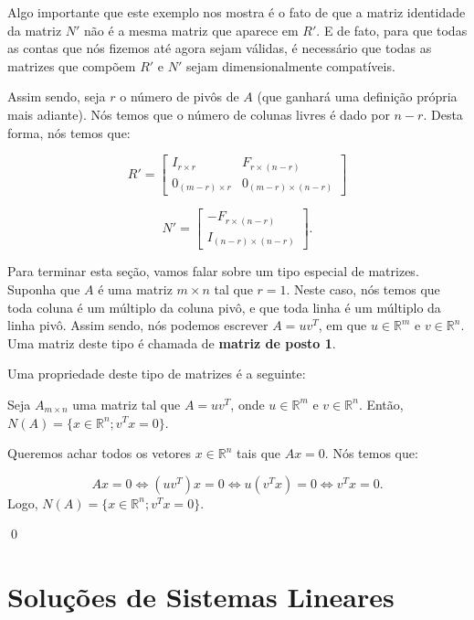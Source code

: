 Algo importante que este exemplo nos mostra é o fato de que a matriz identidade da matriz $N'$ não é a mesma matriz que aparece em $R'$. E de fato, para que todas as contas que nós fizemos até agora sejam válidas, é necessário que todas as matrizes que compõem $R'$ e $N'$ sejam dimensionalmente compatíveis.

Assim sendo, seja $r$ o número de pivôs de $A$ (que ganhará uma definição própria mais adiante). Nós temos que o número de colunas livres é dado por $n - r$. Desta forma, nós temos que:

$$
R' = \begin{bmatrix}
	I_{r\times r} & F_{r\times(n - r)} \\
	0_{(m - r)\times r} & 0_{(m - r)\times(n - r)}
\end{bmatrix}
$$

$$
N' = \begin{bmatrix}
	-F_{r\times(n - r)} \\
	I_{(n - r)\times(n - r)}
\end{bmatrix}.
$$

Para terminar esta seção, vamos falar sobre um tipo especial de matrizes. Suponha que $A$ é uma matriz $m\times n$ tal que $r = 1$. Neste caso, nós temos que toda coluna é um múltiplo da coluna pivô, e que toda linha é um múltiplo da linha pivô. Assim sendo, nós podemos escrever $A = uv^T$, em que $u\in\mathbb{R}^m$ e $v\in\mathbb{R}^n$. Uma matriz deste tipo é chamada de \textbf{matriz de posto 1}.

Uma propriedade deste tipo de matrizes é a seguinte:

\begin{Proposition}
	Seja $A_{m\times n}$ uma matriz tal que $A = uv^T$, onde $u\in\mathbb{R}^m$ e $v\in\mathbb{R}^n$. Então, $N(A) = \{x\in\mathbb{R}^n; v^Tx = 0\}$.
\end{Proposition}

\begin{Proof}
	Queremos achar todos os vetores $x\in\mathbb{R}^n$ tais que $Ax = 0$. Nós temos que:
	
	$$
	Ax = 0 \iff (uv^T)x = 0 \iff u(v^Tx) = 0 \iff v^Tx = 0.
	$$
	Logo, $N(A) = \{x\in\mathbb{R}^n; v^Tx = 0\}$.
	
	\qed
\end{Proof}

\section{Soluções de Sistemas Lineares}

